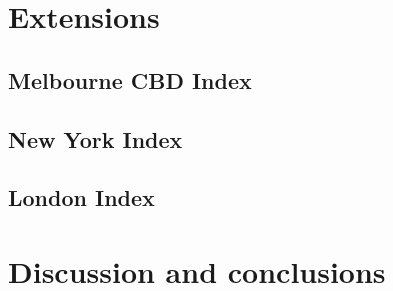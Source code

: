 \documentclass[preprint, 3p,
authoryear]{elsarticle} %
\begin{document}
\hypertarget{extensions-1}{%
\section{Extensions}\label{extensions-1}}

\hypertarget{melbourne-cbd-index}{%
\subsection{Melbourne CBD Index}\label{melbourne-cbd-index}}

\hypertarget{new-york-index}{%
\subsection{New York Index}\label{new-york-index}}

\hypertarget{london-index}{%
\subsection{London Index}\label{london-index}}

\hypertarget{discussion-and-conclusions}{%
\section{Discussion and conclusions}\label{discussion-and-conclusions}}

\renewcommand\refname{References}

\end{document}
